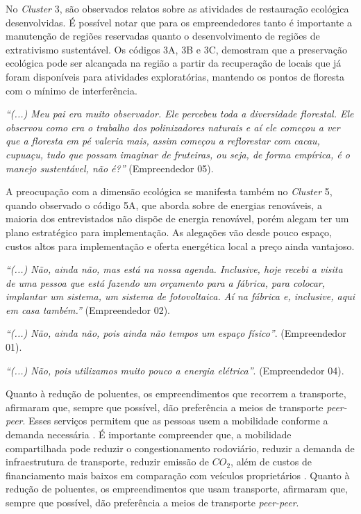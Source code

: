 No \textit{Cluster} 3, são observados relatos sobre as atividades de restauração ecológica desenvolvidas. É possível notar que para os empreendedores tanto é importante a manutenção de regiões reservadas quanto o desenvolvimento de regiões de extrativismo sustentável. Os códigos 3A, 3B e 3C, demostram que a preservação ecológica pode ser alcançada na região a partir da recuperação de locais que já foram disponíveis para atividades exploratórias, mantendo os pontos de floresta com o mínimo de interferência.

\textit{“(...) Meu pai era muito observador. Ele percebeu toda a diversidade florestal. Ele observou como era o trabalho dos polinizadores naturais e aí ele começou a ver que a floresta em pé valeria mais, assim começou a reflorestar com cacau, cupuaçu, tudo que possam imaginar de fruteiras, ou seja, de forma empírica, é o manejo sustentável, não é?”} (Empreendedor 05).

A preocupação com a dimensão ecológica se manifesta também no \textit{Cluster} 5, quando observado o código 5A, que aborda sobre de energias renováveis, a maioria dos entrevistados não dispõe de energia renovável, porém alegam ter um plano estratégico para implementação. As alegações vão desde pouco espaço, custos altos para implementação e oferta energética local a preço ainda vantajoso.

\textit{“(...) Não, ainda não, mas está na nossa agenda. Inclusive, hoje recebi a visita de uma pessoa que está fazendo um orçamento para a fábrica, para colocar, implantar um sistema, um sistema de fotovoltaica. Aí na fábrica e, inclusive, aqui em casa também.”} (Empreendedor 02).

\textit{“(...) Não, ainda não, pois ainda não tempos um espaço físico”}. (Empreendedor 01).

\textit{“(...) Não, pois utilizamos muito pouco a energia elétrica”}. (Empreendedor 04).

Quanto à redução de poluentes, os empreendimentos que recorrem a transporte, afirmaram que, sempre que possível, dão preferência a meios de transporte \textit{peer-peer}. Esses serviços permitem que as pessoas usem a mobilidade conforme a demanda necessária \cite{Shaheen2015DefinitionsUnderstanding,Santos2018SustainabilityModels}. É importante compreender que, a mobilidade compartilhada pode reduzir o congestionamento rodoviário, reduzir a demanda de infraestrutura de transporte, reduzir emissão de $CO_2$, além de custos de financiamento mais baixos em comparação com veículos proprietários \cite{Guyader2021SharedSustainability}. Quanto à redução de poluentes, os empreendimentos que usam transporte, afirmaram que, sempre que possível, dão preferência a meios de transporte \textit{peer-peer}.

